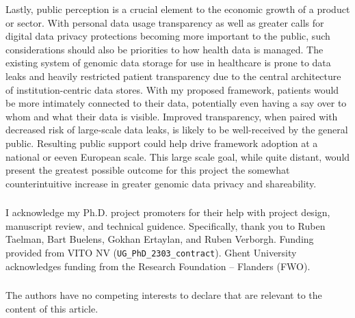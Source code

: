 \documentclass[runningheads]{llncs}
\begin{document}
Lastly, public perception is a crucial element to the economic growth of a product or sector. 
With personal data usage transparency as well as greater calls for digital data privacy protections becoming more important to the public, such considerations should also be priorities to how health data is managed. 
The existing system of genomic data storage for use in healthcare is prone to data leaks and heavily restricted patient transparency due to the central architecture of institution-centric data stores. 
With my proposed framework, patients would be more intimately connected to their data, potentially even having a say over to whom and what their data is visible. 
Improved transparency, when paired with decreased risk of large-scale data leaks, is likely to be well-received by the general public. 
Resulting public support could help drive framework adoption at a national or eeven European scale. 
This large scale goal, while quite distant, would present the greatest possible outcome for this project the somewhat counterintuitive increase in greater genomic data privacy and shareability. 


\begin{credits}
\subsubsection{\ackname} 
I acknowledge my Ph.D. project promoters for their help with project design, manuscript review, and technical guidence.
Specifically, thank you to Ruben Taelman, Bart Buelens, Gokhan Ertaylan, and Ruben Verborgh.
Funding provided from VITO NV (\verb|UG_PhD_2303_contract|). 
Ghent University acknowledges funding from the Research Foundation – Flanders (FWO).
\subsubsection{\discintname} The authors have no competing interests to declare that are relevant to the content of this article.
\end{credits}



\end{document}
